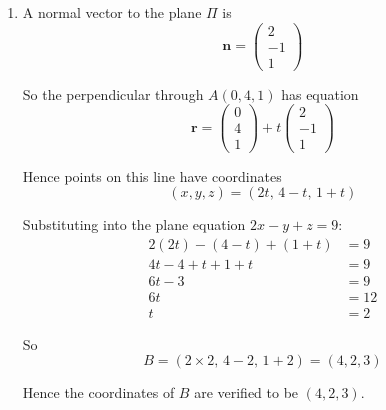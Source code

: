 \documentclass[leqno]{article}
\begin{document}
\begin{enumerate}[
  label=\textbf{\arabic*.},
  leftmargin=*,
  topsep=0pt,
  partopsep=0pt,
  parsep=0pt
]
\begin{djsSolution}
\begin{enumerate}[label=\textbf{(\alph*)}]
  The plane \(\Pi\) has equation
  \[
  \mathbf r\cdot\begin{pmatrix}2\\-1\\1\end{pmatrix}=9
  \]

  so a Cartesian equation of \(\Pi\) is
  \[
  2x-y+z=9
  \]

  Substituting the line coordinates into the plane equation:
  \begin{align*}
  2(1+\lambda)-2\lambda+(1+3\lambda)&=9\\
  2+2\lambda-2\lambda+1+3\lambda&=9\\
  3+3\lambda&=9\\
  3\lambda&=6\\
  \lambda&=2
  \end{align*}

  Hence the point of intersection is
  \[
  (x,y,z)=(1+2,\,2\times 2,\,1+3\times 2)=(3,4,7)
  \]

  \item A normal vector to the plane \(\Pi\) is
  \[
  \mathbf n=\begin{pmatrix}2\\-1\\1\end{pmatrix}
  \]

  So the perpendicular through \(A(0,4,1)\) has equation
  \[
  \mathbf r=\begin{pmatrix}0\\4\\1\end{pmatrix}+t\begin{pmatrix}2\\-1\\1\end{pmatrix}
  \]

  Hence points on this line have coordinates
  \[
  (x,y,z)=(2t,\,4-t,\,1+t)
  \]

  Substituting into the plane equation \(2x-y+z=9\):
  \begin{align*}
  2(2t)-(4-t)+(1+t)&=9\\
  4t-4+t+1+t&=9\\
  6t-3&=9\\
  6t&=12\\
  t&=2
  \end{align*}

  So
  \[
  B=(2\times 2,\,4-2,\,1+2)=(4,2,3)
  \]

  Hence the coordinates of \(B\) are verified to be \((4,2,3)\).


\end{enumerate}
\end{djsSolution}
\end{enumerate}
\end{document}

